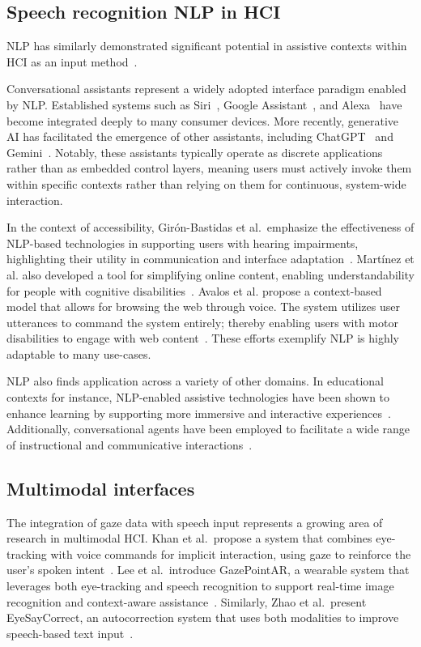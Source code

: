 \subsection{Speech recognition NLP in HCI}

\ac{NLP} has similarly demonstrated significant potential in assistive contexts within HCI as an input method~\cite{song2024review}. 

Conversational assistants represent a widely adopted interface paradigm enabled by NLP. Established systems such as Siri~\cite{apple_siri}, Google Assistant~\cite{google_assistant}, and Alexa~\cite{amazon_alexa} have become integrated deeply to many consumer devices. More recently, generative AI has facilitated the emergence of other assistants, including ChatGPT~\cite{openai_chatgpt} and Gemini~\cite{google_gemini}. Notably, these assistants typically operate as discrete applications rather than as embedded control layers, meaning users must actively invoke them within specific contexts rather than relying on them for continuous, system-wide interaction.

In the context of accessibility, Girón-Bastidas et al.\ emphasize the effectiveness of NLP-based technologies in supporting users with hearing impairments, highlighting their utility in communication and interface adaptation~\cite{gironbastidas2019nlp}. Martínez et al. also developed a tool for simplifying online content, enabling understandability for people with cognitive disabilities~\cite{martinez2024tool}. Avalos et al. propose a context-based model that allows for browsing the web through voice. The system utilizes user utterances to command the system entirely; thereby enabling users with motor disabilities to engage with web content~\cite{avalos2025context}. These efforts exemplify NLP is highly adaptable to many use-cases.

NLP also finds application across a variety of other domains. In educational contexts for instance, NLP-enabled assistive technologies have been shown to enhance learning by supporting more immersive and interactive experiences~\cite{terzopoulos2020voice}. Additionally, conversational agents have been employed to facilitate a wide range of instructional and communicative interactions~\cite{liu2024chatgpt}.

\subsection{Multimodal interfaces}

The integration of gaze data with speech input represents a growing area of research in multimodal HCI. Khan et al.\ propose a system that combines eye-tracking with voice commands for implicit interaction, using gaze to reinforce the user's spoken intent~\cite{khan2022integrating}. Lee et al.\ introduce GazePointAR, a wearable system that leverages both eye-tracking and speech recognition to support real-time image recognition and context-aware assistance~\cite{lee2024gazepointar}. Similarly, Zhao et al.\ present EyeSayCorrect, an autocorrection system that uses both modalities to improve speech-based text input~\cite{zhao2022eyesaycorrect}.

